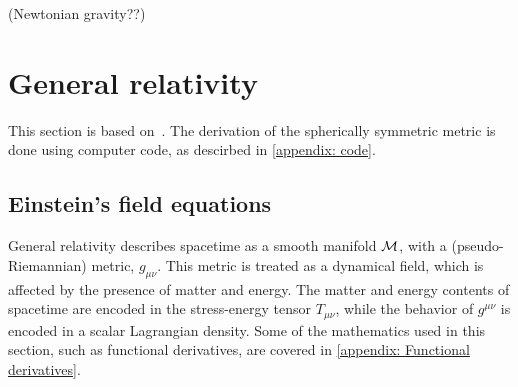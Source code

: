 (Newtonian gravity??)

\section{General relativity}
This section is based on~\cite{carrollSpacetimeGeometryIntroduction2019}.
The derivation of the spherically symmetric metric is done using computer code, as descirbed in \autoref{appendix: code}.

\subsection{Einstein's field equations}

General relativity describes spacetime as a smooth manifold $\mathcal{M}$, with a (pseudo-Riemannian) metric, $g_{\mu \nu}$.
This metric is treated as a dynamical field, which is affected by the presence of matter and energy.
The matter and energy contents of spacetime are encoded in the stress-energy tensor $T_{\mu \nu}$, while the behavior of $g^{\mu \nu}$ is encoded in a scalar Lagrangian density.
Some of the mathematics used in this section, such as functional derivatives, are covered in \autoref{appendix: Functional derivatives}.

